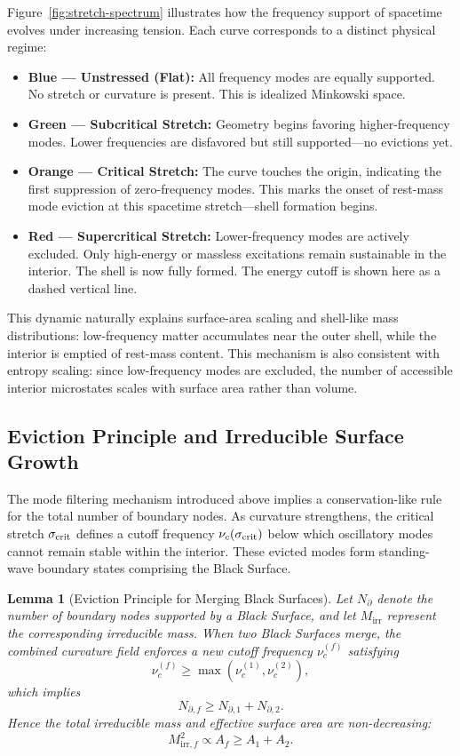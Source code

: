 \documentclass[12pt]{article}
\newtheorem{lemma}[theorem]{Lemma}
\begin{document}
\newpage
Figure~\ref{fig:stretch-spectrum} illustrates how the frequency support of spacetime evolves under increasing tension. Each curve corresponds to a distinct physical regime:
\begin{itemize}
\item \textbf{Blue --- Unstressed (Flat):} All frequency modes are equally supported. No stretch or curvature is present. This is idealized Minkowski space.

\item \textbf{Green --- Subcritical Stretch:} Geometry begins favoring higher-frequency modes. Lower frequencies are disfavored but still supported---no evictions yet.

\item \textbf{Orange --- Critical Stretch:} The curve touches the origin, indicating the first suppression of zero-frequency modes. This marks the onset of rest-mass mode eviction at this spacetime stretch---shell formation begins.

\item \textbf{Red --- Supercritical Stretch:} Lower-frequency modes are actively excluded. Only high-energy or massless excitations remain sustainable in the interior. The shell is now fully formed.  The energy cutoff is shown here as a dashed vertical line.
\end{itemize}

This dynamic naturally explains surface-area scaling and shell-like mass distributions: low-frequency matter accumulates near the outer shell, while the interior is emptied of rest-mass content.  This mechanism is also consistent with entropy scaling: since low-frequency modes are excluded, the number of accessible interior microstates scales with surface area rather than volume.

\subsection{Eviction Principle and Irreducible Surface Growth}

The mode filtering mechanism introduced above implies a conservation-like rule for the total number of boundary nodes.  As curvature strengthens, the critical stretch \(\sigma_{\rm crit}\) defines a cutoff frequency \(\nu_c(\sigma_{\rm crit})\) below which oscillatory modes cannot remain stable within the interior.  These evicted modes form standing-wave boundary states comprising the Black Surface.

\begin{lemma}[Eviction Principle for Merging Black Surfaces]
Let \(N_{\partial}\) denote the number of boundary nodes supported by a Black Surface, and let \(M_{\mathrm{irr}}\) represent the corresponding irreducible mass.  When two Black Surfaces merge, the combined curvature field enforces a new cutoff frequency \(\nu_c^{(f)}\) satisfying
\[
\nu_c^{(f)} \ge \max(\nu_{c}^{(1)}, \nu_{c}^{(2)}),
\]
which implies
\[
N_{\partial,f} \ge N_{\partial,1} + N_{\partial,2}.
\]
Hence the total irreducible mass and effective surface area are non-decreasing:
\[
M_{\mathrm{irr},f}^2 \propto A_f \ge A_1 + A_2.
\]
\end{lemma}
\end{document}
